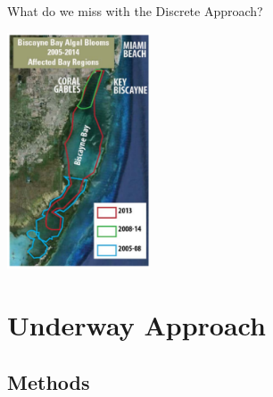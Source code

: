 \documentclass[compress,noflama,nosectionpages]{beamer}
\begin{document}
\begin{frame}{What do we miss with the Discrete Approach?}
	\vspace{-1em}
	\begin{center}
		\includegraphics[height=7cm,keepaspectratio=true,clip=TRUE,trim=0mm 0mm 0mm -2mm]{images/flseagrant_biscayne-blooms.png}
	\end{center}
	\tiny{}
\end{frame}

\section{Underway Approach}
\subsection{Methods}
\end{document}
